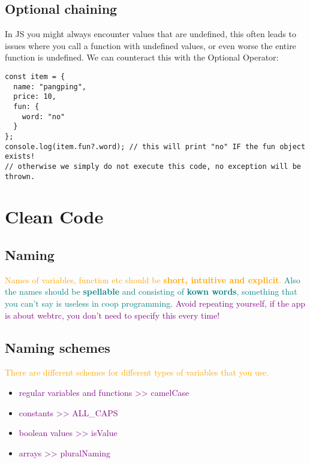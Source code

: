 \documentclass[main.tex,fontsize=6pt,paper=a4,paper=landscape,DIV=calc,]{scrartcl}
\begin{document}
\begin{multicols*}{4}
\subsection{Optional chaining}  
In JS you might always encounter values that are undefined, this often leads to issues where you call a function with undefined values, or even worse the entire function is undefined.\newline
We can counteract this with the Optional Operator:
\vspace{-2mm}
\begin{lstlisting}
const item = {
  name: "pangping",
  price: 10, 
  fun: {
    word: "no"
  }
};
console.log(item.fun?.word); // this will print "no" IF the fun object exists!
// otherwise we simply do not execute this code, no exception will be thrown.
\end{lstlisting}
\vspace{2mm}


\section{Clean Code}

\subsection{Naming}  
\textcolor{orange}{Names of variables, function etc should be \textbf{short, intuitive and explicit}.}\newline
\textcolor{teal}{Also the names should be \textbf{spellable} and consisting of \textbf{kown words}, something that you can't say is useless in coop programming.}\newline
\textcolor{purple}{Avoid repeating yourself, if the app is about webtrc, you don't need to specify this every time!}

\subsection{Naming schemes}  
\textcolor{orange}{There are different schemes for different types of variables that you use.}
\begin{itemize}
\item \textcolor{purple}{regular variables and functions >> camelCase}
\item \textcolor{purple}{constants >> ALL\_CAPS}
\item \textcolor{purple}{boolean values >> isValue}
\item \textcolor{purple}{arrays >> pluralNaming}
\end{itemize} 


\end{multicols*}
\end{document}
